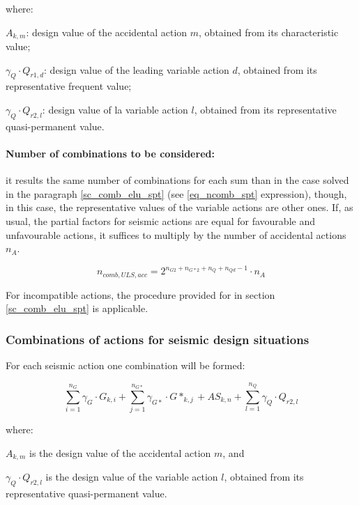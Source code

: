\noindent where:

\begin{description}
\item{$A_{k,m}$:} design value of the accidental action $m$, obtained from its characteristic value;
\item{$\gamma_Q \cdot Q_{r1,d}$:} design value of the leading variable action $d$, obtained from its representative frequent value;
\item{$\gamma_Q \cdot Q_{r2,l}$:} design value of la variable action $l$, obtained from its representative quasi-permanent value.
\end{description}

\paragraph{Number of combinations to be considered:} it results the same number of combinations for each sum than in the case solved in the paragraph \ref{sc_comb_elu_spt} (see \ref{eq_ncomb_spt} expression), though, in this case, the representative values of the variable actions are other ones. If, as usual, the partial factors for seismic actions are equal for favourable and unfavourable actions, it suffices to multiply by the number of accidental actions $n_A$.

\begin{equation} \label{eq_ncomb_acc}
n_{comb,ULS,acc}= 2^{n_{G2}+n_{G*2}+n_{Q}+n_{Qd}-1} \cdot n_A
\end{equation}

For incompatible actions, the procedure provided for in section \ref{sc_comb_elu_spt} is applicable.


\subsubsection{Combinations of actions for seismic design situations} \label{sc_comb_elu_sism}
For each seismic action one combination will be formed:

\begin{equation}\label{eq_comb_sis}
\sum_{i=1}^{n_G} \gamma_G \cdot G_{k,i} +\sum_{j=1}^{n_{G*}} \gamma_{G*} \cdot G*_{k,j} + AS_{k,n} + \sum_{l=1}^{n_Q} \gamma_Q \cdot Q_{r2,l}
\end{equation}

\noindent where:

\begin{description}
\item{$A_{k,m}$} is the design value of the accidental action $m$, and
\item{$\gamma_Q \cdot Q_{r2,l}$} is the design value of the variable action $l$, obtained from its representative quasi-permanent value.
\end{description}

